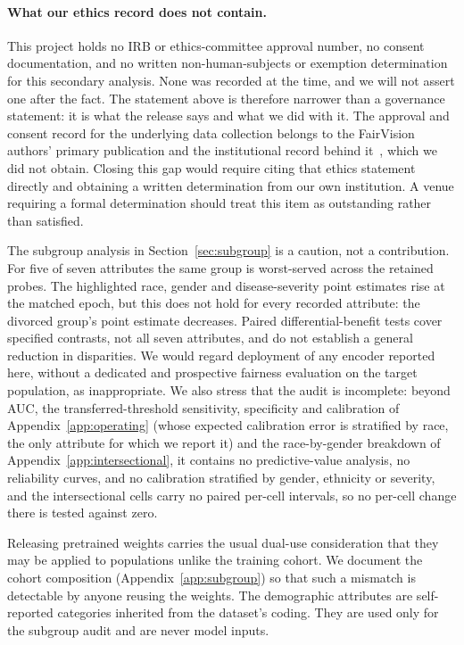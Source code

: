 \documentclass{article}
\begin{document}
\paragraph{What our ethics record does not contain.} This project holds no IRB or
ethics-committee approval number, no consent documentation, and no written
non-human-subjects or exemption determination for this secondary analysis. None
was recorded at the time, and we will not assert one after the fact. The
statement above is therefore narrower than a governance statement: it is what the
release says and what we did with it. The approval and consent record for the
underlying data collection belongs to the FairVision authors' primary
publication and the institutional record behind
it~\citep{luo2024fairvision}, which we did not obtain. Closing this gap would
require citing that ethics statement directly and obtaining a written
determination from our own institution. A venue requiring a formal determination
should treat this item as outstanding rather than satisfied.

The subgroup analysis in Section~\ref{sec:subgroup} is a caution, not a
contribution. For five of seven attributes the same group is worst-served
across the retained probes. The highlighted race, gender and disease-severity
point estimates rise at the matched epoch, but this does not hold for every
recorded attribute: the divorced group's point estimate decreases.
Paired differential-benefit tests cover specified contrasts, not all seven
attributes, and do not establish a general reduction in disparities.
We would regard deployment
of any encoder reported here, without a dedicated and prospective fairness
evaluation on the target population, as inappropriate. We also stress that the
audit is incomplete: beyond AUC, the transferred-threshold sensitivity,
specificity and calibration of Appendix~\ref{app:operating} (whose expected
calibration error is stratified by race, the only attribute for which we report
it) and the race-by-gender
breakdown of Appendix~\ref{app:intersectional}, it contains no
predictive-value analysis, no reliability curves, and no calibration stratified
by gender, ethnicity or severity, and the intersectional
cells carry no paired per-cell intervals, so no per-cell change there is tested
against zero.

Releasing pretrained weights carries the usual dual-use consideration that they
may be applied to populations unlike the training cohort. We document the cohort
composition (Appendix~\ref{app:subgroup}) so that such a mismatch is detectable
by anyone reusing the weights. The demographic attributes are self-reported
categories inherited from the dataset's coding. They are used only for the
subgroup audit and are never model inputs.
\end{document}
